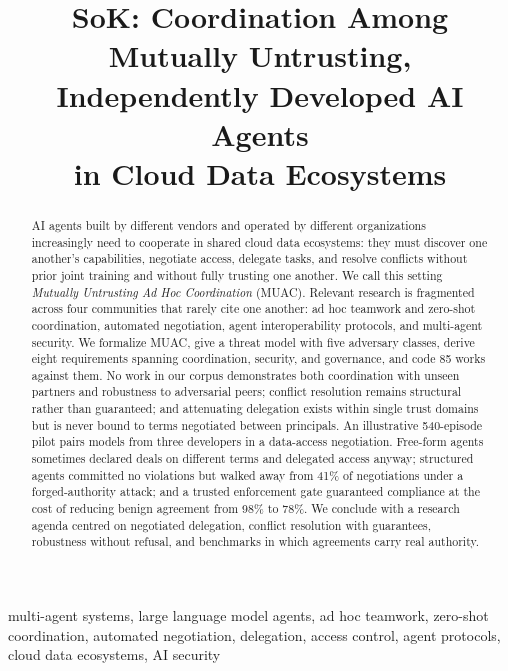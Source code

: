 \documentclass[conference]{IEEEtran}
\begin{document}
\title{SoK: Coordination Among Mutually Untrusting,\\Independently Developed AI Agents\\in Cloud Data Ecosystems}
\author{
}
\maketitle
\begin{abstract}
AI agents built by different vendors and operated by different organizations increasingly need to cooperate in shared cloud data ecosystems: they must discover one another's capabilities, negotiate access, delegate tasks, and resolve conflicts without prior joint training and without fully trusting one another. We call this setting \emph{Mutually Untrusting Ad Hoc Coordination} (MUAC). Relevant research is fragmented across four communities that rarely cite one another: ad hoc teamwork and zero-shot coordination, automated negotiation, agent interoperability protocols, and multi-agent security. We formalize MUAC, give a threat model with five adversary classes, derive eight requirements spanning coordination, security, and governance, and code 85 works against them. No work in our corpus demonstrates both coordination with unseen partners and robustness to adversarial peers; conflict resolution remains structural rather than guaranteed; and attenuating delegation exists within single trust domains but is never bound to terms negotiated between principals. An illustrative 540-episode pilot pairs models from three developers in a data-access negotiation. Free-form agents sometimes declared deals on different terms and delegated access anyway; structured agents committed no violations but walked away from 41\% of negotiations under a forged-authority attack; and a trusted enforcement gate guaranteed compliance at the cost of reducing benign agreement from 98\% to 78\%. We conclude with a research agenda centred on negotiated delegation, conflict resolution with guarantees, robustness without refusal, and benchmarks in which agreements carry real authority.
\end{abstract}

\begin{IEEEkeywords}
multi-agent systems, large language model agents, ad hoc teamwork, zero-shot coordination, automated negotiation, delegation, access control, agent protocols, cloud data ecosystems, AI security
\end{IEEEkeywords}
\end{document}

